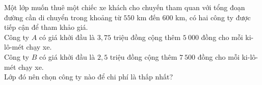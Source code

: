 \begin{bt}%
	Một lớp muốn thuê một chiếc xe khách cho chuyến tham quan với tổng đoạn đường cần di chuyển trong khoảng từ $ 550 $ km đến $ 600 $ km, có hai công ty được tiếp cận để tham khảo giá.\\
	Công ty $ A $ có giá khởi đầu là $ 3{,}75 $ triệu đồng cộng thêm $ 5~000 $ đồng cho mỗi ki-lô-mét chạy xe.\\
	Công ty $ B $ có giá khởi đầu là $ 2{,}5 $ triệu đồng cộng thêm $ 7~500 $ đồng cho mỗi ki-lô-mét chạy xe.\\
	Lớp đó nên chọn công ty nào để chi phí là thấp nhất?
	
\end{bt}

